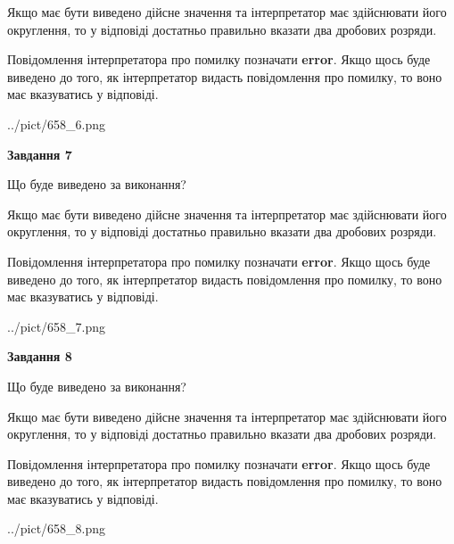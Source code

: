 \documentclass[12pt, ukrainian]{article}
\begin{document}
{\begin {Large}
Якщо має бути виведено дійсне значення та інтерпретатор має здійснювати його округлення, 
то у відповіді достатньо правильно вказати два дробових розряди.

Повідомлення інтерпретатора про помилку позначати \textbf{error}.
Якщо щось буде виведено до того, як інтерпретатор видасть повідомлення про помилку, 
то воно має вказуватись у відповіді. \par

\begin{center}
	{../pict/658_6.png}
\end{center}
\newpage

{\begin {center}\textbf{Завдання 7}\end {center}}\par
Що буде виведено за виконання? \par

Якщо має бути виведено дійсне значення та інтерпретатор має здійснювати його округлення, 
то у відповіді достатньо правильно вказати два дробових розряди.

Повідомлення інтерпретатора про помилку позначати \textbf{error}.
Якщо щось буде виведено до того, як інтерпретатор видасть повідомлення про помилку, 
то воно має вказуватись у відповіді. \par

\begin{center}
	{../pict/658_7.png}
\end{center}
\newpage

{\begin {center}\textbf{Завдання 8}\end {center}}\par
Що буде виведено за виконання? \par

Якщо має бути виведено дійсне значення та інтерпретатор має здійснювати його округлення, 
то у відповіді достатньо правильно вказати два дробових розряди.

Повідомлення інтерпретатора про помилку позначати \textbf{error}.
Якщо щось буде виведено до того, як інтерпретатор видасть повідомлення про помилку, 
то воно має вказуватись у відповіді. \par

\begin{center}
	{../pict/658_8.png}
\end{center}
\newpage


\end{Large}}
\end{document}
